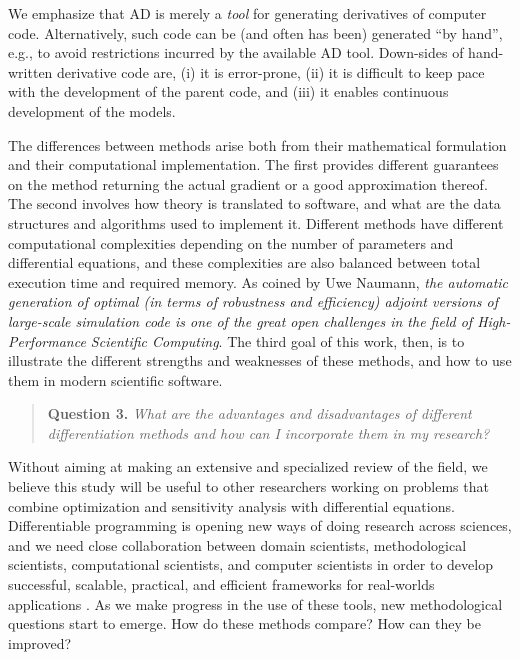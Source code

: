 We emphasize that AD is merely a \emph{tool} for generating derivatives of computer code. Alternatively, such code can be (and often has been) generated ``by hand'', e.g., to avoid restrictions incurred by the available AD tool.
Down-sides of hand-written derivative code are, (i) it is error-prone, (ii) it is difficult to keep pace with the development of the parent code, and (iii) it enables continuous development of the models.


The differences between methods arise both from their mathematical formulation and their computational implementation. 
The first provides different guarantees on the method returning the actual gradient or a good approximation thereof. 
The second involves how theory is translated to software, and what are the data structures and algorithms used to implement it. 
Different methods have different computational complexities depending on the number of parameters and differential equations, and these complexities are also balanced between total execution time and required memory. 
As coined by Uwe Naumann, \textit{the automatic generation of optimal (in terms of robustness and efficiency) adjoint versions of large-scale simulation code is one of the great open challenges in the field of High-Performance Scientific Computing}\cite{Naumann.2011}.
The third goal of this work, then, is to illustrate the different strengths and weaknesses of these methods, and how to use them in modern scientific software. 
\begin{quote}
    \textbf{Question 3. }
    \textit{What are the advantages and disadvantages of different differentiation methods and how can I incorporate them in my research?}
\end{quote}

Without aiming at making an extensive and specialized review of the field, we believe this study will be useful to other researchers working on problems that combine optimization and sensitivity analysis with differential equations.
Differentiable programming is opening new ways of doing research across sciences, and we need close collaboration between domain scientists, methodological scientists, computational scientists, and computer scientists in order to develop successful, scalable, practical, and efficient frameworks for real-worlds applications \cite{Frank2022}.
As we make progress in the use of these tools, new methodological questions start to emerge. 
How do these methods compare? How can they be improved? 

